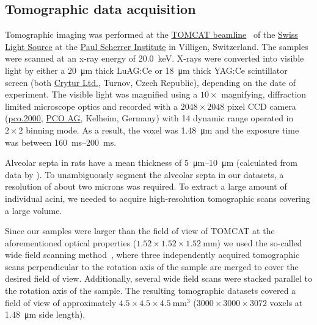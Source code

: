 \documentclass[paper=a4,twocolumn=true,DIV=calc,abstract,english]{scrartcl}
\begin{document}
\subsection{Tomographic data acquisition}
Tomographic imaging was performed at the \href{http://www.psi.ch/sls/tomcat/}{TOMCAT beamline}~\citep{Stampanoni2006a} of the \href{http://www.psi.ch/sls/}{Swiss Light Source} at the \href{http://www.psi.ch/}{Paul Scherrer Institute} in Villigen, Switzerland.
The samples were scanned at an x-ray energy of \SI{20.0}{\kilo\electronvolt}. X-rays were converted into visible light by either a \SI{20}{\micro\meter} thick LuAG:Ce or \SI{18}{\micro\meter} thick YAG:Ce scintillator screen (both \href{http://www.crytur.cz/}{Crytur Ltd.}, Turnov, Czech Republic), depending on the date of experiment.
The visible light was magnified using a \(10\times\) magnifying, diffraction limited microscope optics and recorded with a \(2048\times2048\) pixel CCD camera (\href{http://www.pco.de/sensitive-cameras/pco2000/}{pco.2000}, \href{http://www.pco.de/}{PCO AG}, Kelheim, Germany) with \SI{14}{\bit} dynamic range operated in \(2\times2\) binning mode.
As a result, the voxel  was \SI{1.48}{\micro\meter} and the exposure time was between \SIrange{160}{200}{\milli\second}.

Alveolar septa in rats have a mean thickness of \SIrange{5}{10}{\micro\meter} (calculated from data by \citet{Burri1974}).
To unambiguously segment the alveolar septa in our datasets, a resolution of about two microns was required.
To extract a large amount of individual acini, we needed to acquire high-resolution tomographic scans covering a large volume.

Since our samples were larger than the field of view of TOMCAT at the aforementioned optical properties (\(1.52\times1.52\times\SI{1.52}{\milli\meter}\)) we used the so-called wide field scanning method~\citep{Haberthuer2010}, where three independently acquired tomographic scans perpendicular to the rotation axis of the sample are merged to cover the desired field of view.
Additionally, several wide field scans were stacked parallel to the rotation axis of the sample.
The resulting tomographic datasets covered a field of view of approximately \(4.5\times4.5\times\SI{4.5}{\milli\meter\cubed}\) (\(3000\times3000\times3072\) voxels at \SI{1.48}{\micro\meter} side length).
\end{document}
